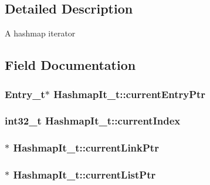 \subsection{Detailed Description}
A hashmap iterator 

\subsection{Field Documentation}
\subsubsection[{\texorpdfstring{current\+Entry\+Ptr}{currentEntryPtr}}]{\setlength{\rightskip}{0pt plus 5cm}Entry\+\_\+t$\ast$ Hashmap\+It\+\_\+t\+::current\+Entry\+Ptr}\hypertarget{struct_hashmap_it__t_a171bb41f7cbfee64167525d662e81de2}{}\label{struct_hashmap_it__t_a171bb41f7cbfee64167525d662e81de2}
\subsubsection[{\texorpdfstring{current\+Index}{currentIndex}}]{\setlength{\rightskip}{0pt plus 5cm}int32\+\_\+t Hashmap\+It\+\_\+t\+::current\+Index}\hypertarget{struct_hashmap_it__t_ab8ed43a009cc8d12c5b973e43ec0e3d0}{}\label{struct_hashmap_it__t_ab8ed43a009cc8d12c5b973e43ec0e3d0}
\subsubsection[{\texorpdfstring{current\+Link\+Ptr}{currentLinkPtr}}]{$\ast$ Hashmap\+It\+\_\+t\+::current\+Link\+Ptr}\hypertarget{struct_hashmap_it__t_ac6946a0f68f54f2fa76360f3abe80915}{}\label{struct_hashmap_it__t_ac6946a0f68f54f2fa76360f3abe80915}
\subsubsection[{\texorpdfstring{current\+List\+Ptr}{currentListPtr}}]{$\ast$ Hashmap\+It\+\_\+t\+::current\+List\+Ptr}\hypertarget{struct_hashmap_it__t_a76f65f07d1a0442411da4b50b17406a5}{}\label{struct_hashmap_it__t_a76f65f07d1a0442411da4b50b17406a5}
